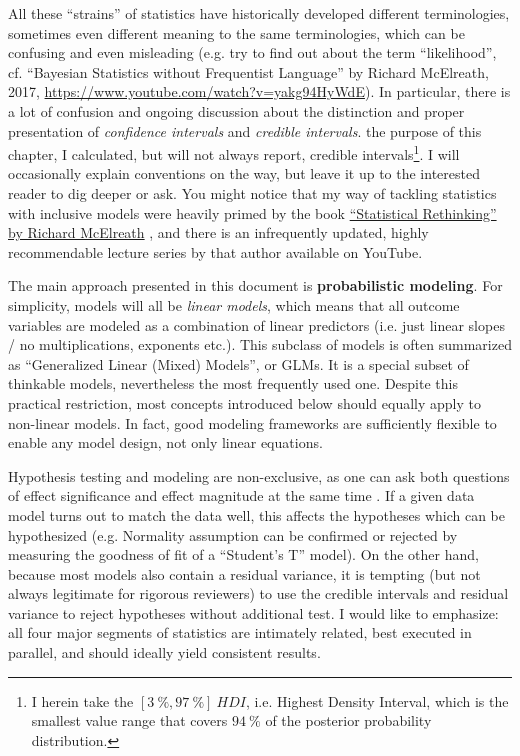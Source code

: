 All these ``strains'' of statistics have historically developed different terminologies, sometimes even different meaning to the same terminologies, which can be confusing and even misleading (e.g. try to find out about the term ``likelihood'', cf. ``Bayesian Statistics without Frequentist Language'' by Richard McElreath, 2017, \url{https://www.youtube.com/watch?v=yakg94HyWdE}).
In particular, there is a lot of confusion and ongoing discussion about the distinction and proper presentation of \emph{confidence intervals} and \emph{credible intervals}.
 the purpose of this chapter, I calculated, but will not always report, credible intervals\footnote{I herein take the $\left[3\ \%,97\ \%\right]\ HDI$, i.e. Highest Density Interval, which is the smallest value range that covers $94\ \%$ of the posterior probability distribution.}.
I will occasionally explain conventions on the way, but leave it up to the interested reader to dig deeper or ask.
You might notice that my way of tackling statistics with inclusive models were heavily primed by the book \href{https://xcelab.net/rm/statistical-rethinking/}{``Statistical Rethinking'' by Richard McElreath} \citep{McElreath2018}, and there is an infrequently updated, highly recommendable lecture series by that author available on YouTube.


The main approach presented in this document is \textbf{probabilistic modeling}.
For simplicity, models will all be \emph{linear models}, which means that all outcome variables are modeled as a combination of linear predictors (i.e. just linear slopes / no multiplications, exponents etc.).
This subclass of models is often summarized as ``Generalized Linear (Mixed) Models'', or GLMs.
It is a special subset of thinkable models, nevertheless the most frequently used one.
Despite this practical restriction, most concepts introduced below should equally apply to non-linear models.
In fact, good modeling frameworks are sufficiently flexible to enable any model design, not only linear equations.
\bigskip


Hypothesis testing and modeling are non-exclusive, as one can ask both questions of effect significance and effect magnitude at the same time .
If a given data model turns out to match the data well, this affects the hypotheses which can be hypothesized (e.g. Normality assumption can be confirmed or rejected by measuring the goodness of fit of a ``Student's T'' model).
On the other hand, because most models also contain a residual variance, it is tempting (but not always legitimate for rigorous reviewers) to use the credible intervals and residual variance to reject hypotheses without additional test.
I would like to emphasize: all four major segments of statistics are intimately related, best executed in parallel, and should ideally yield consistent results.

